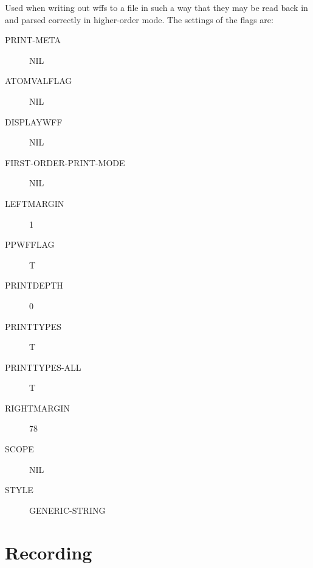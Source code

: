 \begin{description} 
\item[RE-READ]  
Used when writing out wffs to a file
in such a way that they may be read back in and parsed correctly
in higher-order mode. The settings of the flags are:
\begin{description}
\item[PRINT-META] NIL

\item[ATOMVALFLAG] NIL

\item[DISPLAYWFF] NIL

\item[FIRST-ORDER-PRINT-MODE] NIL

\item[LEFTMARGIN] 1

\item[PPWFFLAG] T

\item[PRINTDEPTH] 0

\item[PRINTTYPES] T

\item[PRINTTYPES-ALL] T

\item[RIGHTMARGIN] 78

\item[SCOPE] NIL

\item[STYLE] GENERIC-STRING

\end{description}

\item
\end{description}

\section{Recording}


